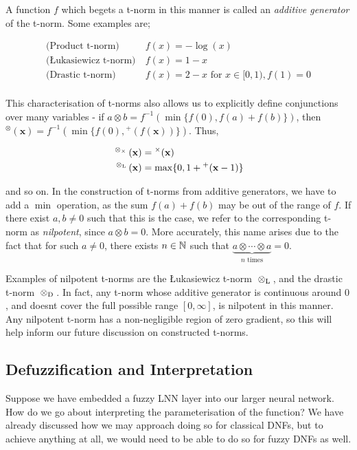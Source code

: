 A function $f$ which begets a t-norm in this manner is called an \textit{additive generator} of the t-norm. Some examples are;

$$
\begin{aligned}
\text{(Product t-norm)} &\ f(x) = -\log(x) \\
\text{(Łukasiewicz t-norm)} &\ f(x) = 1 - x \\
\text{(Drastic t-norm)} &\ f(x) = 2 - x \text{ for } x \in [0,1), f(1) = 0\\
\end{aligned}
$$

This characterisation of t-norms also allows us to explicitly define conjunctions over many variables - if $a \otimes b = f^{-1}(\min\{f(0), f(a) + f(b)\})$, then ${^\otimes}(\mathbf{x}) = f^{-1}(\min\{f(0),{^+}(f(\mathbf{x}))\})$. Thus,

$$
\begin{aligned}
^{\mspace{4mu}\otimes_\times\mspace{4mu}}(\mathbf{x}) &= {^\times}(\mathbf{x}) \\
^{\mspace{4mu}\otimes_\text{L}\mspace{4mu}}(\mathbf{x}) &= \max\{0, 1 + {^+}(\mathbf{x} - 1)\}
\end{aligned}
$$


and so on. In the construction of t-norms from additive generators, we have to add a $\min$ operation, as the sum $f(a) + f(b)$ may be out of the range of $f$. If there exist $a,b \neq 0$ such that this is the case, we refer to the corresponding t-norm as \textit{nilpotent}, since $a \otimes b = 0$. More accurately, this name arises due to the fact that for such $a \neq 0$, there exists $n \in \mathbb{N}$ such that $\underbrace{a \otimes \cdots \otimes a}_{n \text{ times}} = 0$. 

Examples of nilpotent t-norms are the Łukasiewicz t-norm ${\mspace{4mu}\otimes_\text{L}\mspace{4mu}}$, and the drastic t-norm ${\mspace{4mu}\otimes_\text{D}\mspace{4mu}}$. In fact, any t-norm whose additive generator is continuous around $0$, and doesnt cover the full possible range $[0, \infty]$, is nilpotent in this manner. Any nilpotent t-norm has a non-negligible region of zero gradient, so this will help inform our future discussion on constructed t-norms.

\subsection{Defuzzification and Interpretation}

Suppose we have embedded a fuzzy LNN layer into our larger neural network. How do we go about interpreting the parameterisation of the function? We have already discussed how we may approach doing so for classical DNFs, but to achieve anything at all, we would need to be able to do so for fuzzy DNFs as well.

